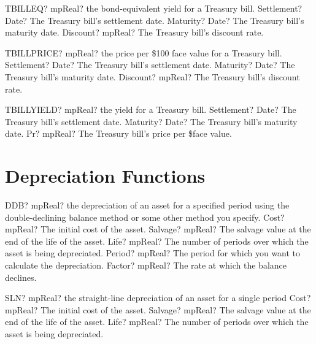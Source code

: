 \documentclass[12pt,a4paper,openany]{book}
\begin{document}
\begin{mpFunctionsExtract}
\mpWorksheetFunctionThreeNotImplemented
{TBILLEQ? mpReal? the bond-equivalent yield for a Treasury bill.}
{Settlement? Date?  The Treasury bill's settlement date.}
{Maturity? Date? The Treasury bill's maturity date.}
{Discount? mpReal? The Treasury bill's discount rate.}
\end{mpFunctionsExtract}

\begin{mpFunctionsExtract}
\mpWorksheetFunctionThreeNotImplemented
{TBILLPRICE? mpReal? the price per \$100 face value for a Treasury bill.}
{Settlement? Date?  The Treasury bill's settlement date.}
{Maturity? Date? The Treasury bill's maturity date.}
{Discount? mpReal? The Treasury bill's discount rate.}
\end{mpFunctionsExtract}

\begin{mpFunctionsExtract}
\mpWorksheetFunctionThreeNotImplemented
{TBILLYIELD? mpReal? the yield for a Treasury bill.}
{Settlement? Date?  The Treasury bill's settlement date.}
{Maturity? Date? The Treasury bill's maturity date.}
{Pr? mpReal? The Treasury bill's price per \$face value.}
\end{mpFunctionsExtract}

\section{Depreciation Functions}

\begin{mpFunctionsExtract}
\mpWorksheetFunctionFiveNotImplemented
{DDB? mpReal? the depreciation of an asset for a specified period using the double-declining balance method or some other method you specify.}
{Cost? mpReal?  The initial cost of the asset.}
{Salvage? mpReal? The salvage value at the end of the life of the asset.}
{Life? mpReal? The number of periods over which the asset is being depreciated.}
{Period? mpReal? The period for which you want to calculate the depreciation.}
{Factor? mpReal? The rate at which the balance declines.}
\end{mpFunctionsExtract}

\begin{mpFunctionsExtract}
\mpWorksheetFunctionThreeNotImplemented
{SLN? mpReal? the straight-line depreciation of an asset for a single period}
{Cost? mpReal?  The initial cost of the asset.}
{Salvage? mpReal? The salvage value at the end of the life of the asset.}
{Life? mpReal? The number of periods over which the asset is being depreciated.}
\end{mpFunctionsExtract}
\end{document}
